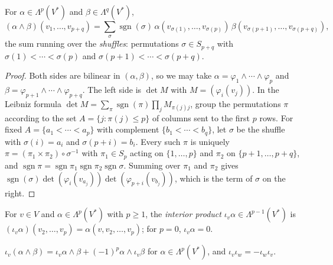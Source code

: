 \begin{proposition}\label{multilinear-algebra:proposition-wedge-formula}
For $\alpha \in \Lambda^p(V^*)$ and $\beta \in \Lambda^q(V^*)$,
\[
(\alpha \wedge \beta)(v_1, \ldots, v_{p+q}) = \sum_{\sigma} \operatorname{sgn}(\sigma)\, \alpha(v_{\sigma(1)}, \ldots, v_{\sigma(p)})\,
\beta(v_{\sigma(p+1)}, \ldots, v_{\sigma(p+q)}),
\]
the sum running over the \emph{shuffles}: permutations $\sigma \in S_{p+q}$ with $\sigma(1) < \cdots < \sigma(p)$ and
$\sigma(p+1) < \cdots < \sigma(p+q)$.
\end{proposition}

\begin{proof}
Both sides are bilinear in $(\alpha, \beta)$, so we may take $\alpha = \varphi_1 \wedge \cdots \wedge \varphi_p$ and
$\beta = \varphi_{p+1} \wedge \cdots \wedge \varphi_{p+q}$. The left side is $\det M$ with $M = (\varphi_i(v_j))$. In the Leibniz
formula $\det M = \sum_\pi \operatorname{sgn}(\pi)\prod_j M_{\pi(j) j}$, group the permutations $\pi$ according to the set
$A = \{j : \pi(j) \leq p\}$ of columns sent to the first $p$ rows. For fixed $A = \{a_1 < \cdots < a_p\}$ with complement
$\{b_1 < \cdots < b_q\}$, let $\sigma$ be the shuffle with $\sigma(i) = a_i$ and $\sigma(p + i) = b_i$. Every such $\pi$ is
uniquely $\pi = (\pi_1 \times \pi_2) \circ \sigma^{-1}$ with $\pi_1 \in S_p$ acting on $\{1, \ldots, p\}$ and $\pi_2$ on
$\{p+1, \ldots, p+q\}$, and $\operatorname{sgn}\pi = \operatorname{sgn}\pi_1 \operatorname{sgn}\pi_2 \operatorname{sgn}\sigma$. Summing over $\pi_1$ and $\pi_2$
gives $\operatorname{sgn}(\sigma)\det(\varphi_i(v_{a_j}))\det(\varphi_{p+i}(v_{b_j}))$, which is the term of $\sigma$ on the right.
\end{proof}

\begin{definition}\label{multilinear-algebra:definition-interior-product}
For $v \in V$ and $\alpha \in \Lambda^p(V^*)$ with $p \geq 1$, the \emph{interior product} $\iota_v\alpha \in \Lambda^{p-1}(V^*)$ is
$(\iota_v\alpha)(v_2, \ldots, v_p) = \alpha(v, v_2, \ldots, v_p)$; for $p = 0$, $\iota_v\alpha = 0$.
\end{definition}

\begin{proposition}\label{multilinear-algebra:proposition-interior-antiderivation}
$\iota_v(\alpha \wedge \beta) = \iota_v\alpha \wedge \beta + (-1)^p\alpha \wedge \iota_v\beta$ for $\alpha \in \Lambda^p(V^*)$, and
$\iota_v \iota_w = -\iota_w\iota_v$.
\end{proposition}

